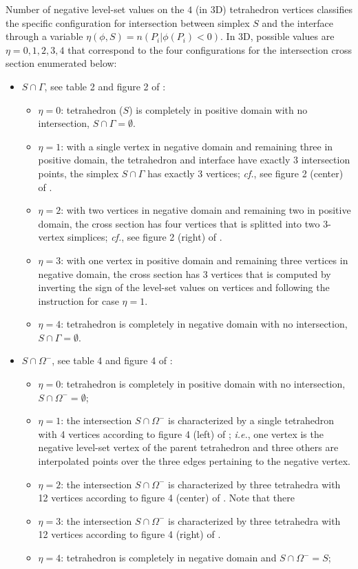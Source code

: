 \documentclass{elsarticle}
\begin{document}
Number of negative level-set values on the $4$ (in 3D) tetrahedron vertices classifies the specific configuration for intersection between simplex $S$ and the interface through a variable $\eta(\phi, S)=n({P_i | \phi(P_i)<0})$. In 3D, possible values are $\eta =0,1,2,3,4$ that correspond to the four configurations for the intersection cross section enumerated below:
\begin{itemize}
\item $S\cap\Gamma$, see table 2 and figure 2 of \cite{min2007geometric}:
	\begin{itemize}
		\item $\eta=0$: tetrahedron ($S$) is completely in positive domain with no intersection, $S\cap\Gamma=\emptyset$.
		\item $\eta=1$: with a single vertex in negative domain and remaining three in positive domain, the tetrahedron and interface have exactly $3$ intersection points, the simplex $S\cap\Gamma$ has exactly $3$ vertices; \textit{cf.}, see figure 2 (center) of  \cite{min2007geometric}.   
		\item $\eta=2$: with two vertices in negative domain and remaining two in positive domain, the cross section has four vertices that is splitted into two 3-vertex simplices; \textit{cf.}, see figure 2 (right) of  \cite{min2007geometric}.
		\item $\eta=3$: with one vertex in positive domain and remaining three vertices in negative domain, the cross section has 3 vertices that is computed by inverting the sign of the level-set values on vertices and following the instruction for case $\eta=1$.
		\item $\eta=4$: tetrahedron is completely in negative domain with no intersection, $S\cap\Gamma=\emptyset$.
	\end{itemize}

\item $S\cap \Omega^-$, see table 4 and figure 4 of \cite{min2007geometric}:
	\begin{itemize}
		\item $\eta=0$: tetrahedron is completely in positive domain with no intersection, $S\cap\Omega^-=\emptyset$; 
		\item $\eta=1$: the intersection $S\cap\Omega^-$ is characterized by a single tetrahedron with 4 vertices according to figure 4 (left) of \cite{min2007geometric}; \textit{i.e.}, one vertex is the negative level-set vertex of the parent tetrahedron and three others are interpolated points over the three edges pertaining to the negative vertex.
		\item $\eta=2$: the intersection $S\cap\Omega^-$ is characterized by three tetrahedra with 12 vertices according to figure 4 (center) of \cite{min2007geometric}. Note that there 
		\item $\eta=3$: the intersection $S\cap\Omega^-$ is characterized by three tetrahedra with 12 vertices according to figure 4 (right) of \cite{min2007geometric}.
		\item $\eta=4$: tetrahedron is completely in negative domain and $S\cap\Omega^-=S$; 
	\end{itemize}

\end{itemize}
\end{document}

